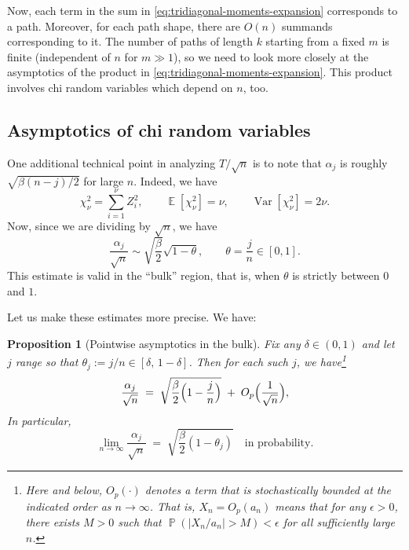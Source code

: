 \documentclass[letterpaper,11pt,oneside,reqno]{article}
\numberwithin{equation}{section}
\newtheorem{proposition}{Proposition}[section]
\theoremstyle{definition}
\begin{document}
Now, each term in the sum in \eqref{eq:tridiagonal-moments-expansion}
corresponds to a path. Moreover, for each path shape,
there are $O(n)$ summands corresponding to it. The number of
paths of length $k$ starting from a fixed $m$
is finite (independent of $n$ for $m\gg 1$),
so we need to look more closely at the asymptotics of the product
in \eqref{eq:tridiagonal-moments-expansion}. This product
involves chi random variables which depend on $n$, too.

\subsection{Asymptotics of chi random variables}
\label{sub:chi-asymptotics}

One additional technical point in analyzing $T/\sqrt{n}$ is to note that $\alpha_j$
is roughly $\sqrt{\beta(n-j)/2}$ for large $n$.
Indeed, we have
\begin{equation*}
	\chi^2_\nu=\sum_{i=1}^\nu Z_i^2,\qquad
	\operatorname{\mathbb{E}}[\chi^2_\nu]=\nu,\qquad
	\operatorname{Var}[\chi^2_\nu]=2\nu.
\end{equation*}
Now, since we are dividing by $\sqrt n$, we have
\begin{equation*}
	\frac{\alpha_j}{\sqrt n}\sim \sqrt{\frac{\beta}{2}}\sqrt{1-\theta},\qquad
	\theta=\frac{j}{n}\in [0,1].
\end{equation*}
This estimate is valid in the ``bulk'' region, that is, when $\theta$ is strictly between $0$ and $1$.

Let us make these estimates more precise.  We have:
\begin{proposition}[Pointwise asymptotics in the bulk]
\label{prop:alpha-bulk}
Fix any $\delta \in (0,1)$ and let $j$ range so that $\theta_j := j/n \in [\delta,\, 1-\delta]$.
Then for each such $j$, we have\footnote{Here and below, $O_p(\cdot)$ denotes a term that is stochastically bounded at the indicated order as $n\to\infty$. That is, $X_n = O_p(a_n)$ means that for any $\epsilon>0$, there exists $M>0$ such that $\operatorname{\mathbb{P}}(|X_n/a_n| > M) < \epsilon$ for all sufficiently large $n$.}
\[
  \frac{\alpha_j}{\sqrt{n}}
	\;=\; \sqrt{\frac{\beta}{2}\Bigl(1 - \frac{j}{n}\Bigr)}
  \;+\; O_p\Bigl(\frac{1}{\sqrt{n}}\Bigr),
\]
In particular,
\[
  \lim_{n\to\infty} \frac{\alpha_j}{\sqrt{n}}
	\;=\; \sqrt{\frac{\beta}{2}(1-\theta_j)}
  \quad\text{in probability.}
\]
\end{proposition}
\end{document}
